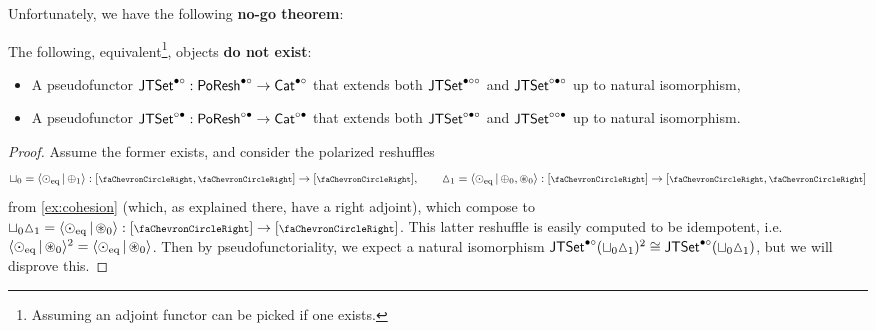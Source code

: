 \documentclass[a4paper]{memoir}
\begin{document}
Unfortunately, we have the following \textbf{no-go theorem}:
\begin{theorem} \label{thm:poresh-jtset:nogo}
	The following, equivalent\footnote{Assuming an adjoint functor can be picked if one exists.}, objects \textbf{do not exist}:
	\begin{itemize}
		\item A pseudofunctor $\mathsf{JTSet}^{\bullet \circ} : \mathsf{PoResh}^{\bullet \circ} \to {\mathsf{Cat}}^{\bullet \circ}$ that extends both $\mathsf{JTSet}^{\bullet \circ \circ}$ and $\mathsf{JTSet}^{\circ \bullet \circ}$ up to natural isomorphism,
		\item A pseudofunctor $\mathsf{JTSet}^{\circ \bullet} : \mathsf{PoResh}^{\circ \bullet} \to {\mathsf{Cat}}^{\circ \bullet}$ that extends both $\mathsf{JTSet}^{\circ \bullet \circ}$ and $\mathsf{JTSet}^{\circ \circ \bullet}$ up to natural isomorphism.
	\end{itemize}
\end{theorem}
\begin{proof}
	Assume the former exists, and consider the polarized reshuffles
	\[
		\cohfget_0 = \reshlist{\nonpol_\eqtydeg}{\pospol_1} : [\ypolar, \ypolar] \to [\ypolar], \qquad
		\cohdisc_1 = \reshlist{\nonpol_\eqtydeg}{\pospol_0, \isopol_0} : [\ypolar] \to [\ypolar, \ypolar]
	\]
	from \cref{ex:cohesion} (which, as explained there, have a right adjoint), which compose to $\cohfget_0 \cohdisc_1 = \reshlist{\nonpol_\eqtydeg}{\isopol_0} : [\ypolar] \to [\ypolar]$.
	This latter reshuffle is easily computed to be idempotent, i.e.\ $\mathopen{}\left\langle {\odot}_{\mathrm{eq}} \,\middle|\, {\oast}_0 \right\rangle\mathclose{}^2 = \mathopen{}\left\langle {\odot}_{\mathrm{eq}} \,\middle|\, {\oast}_0 \right\rangle\mathclose{}$.
	Then by pseudofunctoriality, we expect a natural isomorphism $\mathsf{JTSet}^{\bullet \circ}({\sqcup}_0 {\vartriangle}_1)^2 \cong \mathsf{JTSet}^{\bullet \circ}({\sqcup}_0 {\vartriangle}_1)$, but we will disprove this.
	

\end{proof}
\end{document}
